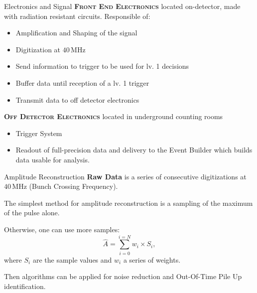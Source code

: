 \documentclass[10pt]{beamer}
\begin{document}
\begin{frame}{Electronics and Signal}
    \textsc{\textbf{Front End Electronics}} located on-detector, made with radiation resistant circuits. Responsible of:
    \begin{itemize}
        \item Amplification and Shaping of the signal
        \item Digitization at $40\,$MHz
        \item Send information to trigger to be used for lv. 1 decisions
        \item Buffer data until reception of a lv. 1 trigger
        \item Transmit data to off detector electronics
    \end{itemize}{}
    \textsc{\textbf{Off Detector Electronics}} located in underground counting rooms
    \begin{itemize}
        \item Trigger System
        \item Readout of full-precision data and delivery to the Event Builder which builds data usable for analysis.
    \end{itemize}
\end{frame}

\begin{frame}{Amplitude Reconstruction}
    \textbf{Raw Data} is a series of consecutive digitizations at $40\,$MHz (Bunch Crossing Frequency).
    
    The simplest method for amplitude reconstruction is a sampling of the maximum of the pulse alone.
    
    Otherwise, one can use more samples:
    \begin{equation}
        \hat{A} = \sum_{i=0}^{i=N} w_i \times S_i ,
    \end{equation}
    where $S_i$ are the sample values and $w_i$ a series of weights. 
    
    Then algorithms can be applied for noise reduction and Out-Of-Time Pile Up identification.
\end{frame}
\end{document}
